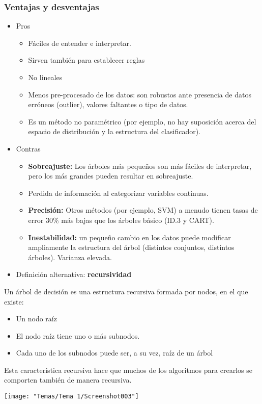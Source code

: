 \subsubsection{Ventajas y desventajas}
\begin{itemize}[label=\color{lightblue}\textbullet]
	\item Pros
	\begin{itemize}
		\item Fáciles de entender e interpretar.
		\item Sirven también para establecer reglas
		\item No lineales
		\item Menos pre-procesado de los datos: son robustos ante presencia de datos erróneos (outlier), valores faltantes o tipo de datos.
		\item Es un método no paramétrico (por ejemplo, no hay suposición acerca del espacio de distribución y la estructura del clasificador).
	\end{itemize}
	\item Contras
	\begin{itemize}
		\item \textbf{Sobreajuste:} Los árboles más pequeños son más fáciles de interpretar, pero los más grandes pueden resultar en sobreajuste.
		\item Perdida de información al categorizar variables continuas.
		\item \textbf{Precisión:} Otros métodos (por ejemplo, SVM) a menudo tienen tasas de error 30\% más bajas que los árboles básico (ID.3 y CART).
		\item \textbf{Inestabilidad:} un pequeño cambio en los datos puede modificar ampliamente la estructura del árbol (distintos conjuntos, distintos árboles). Varianza elevada.
	\end{itemize}
\end{itemize}
\begin{itemize}[label=\color{red}\textbullet, leftmargin=*]
	\item \color{lightblue}Definición alternativa: \textbf{recursividad}
\end{itemize}
Un árbol de decisión es una estructura recursiva formada por nodos, en el que existe:
\begin{itemize}
	\item Un nodo raíz
	\item El nodo raíz tiene uno o más subnodos.
	\item Cada uno de los subnodos puede ser, a su vez, raíz de un árbol
\end{itemize}
Esta característica recursiva hace que muchos de los algoritmos para crearlos se comporten también de manera recursiva.
\begin{center}
	\texttt{[image: "Temas/Tema 1/Screenshot003"]}
\end{center}
